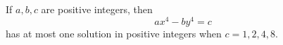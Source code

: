 \begin{proposition}
    If $a,b,c$ are positive integers, then
\[
    ax^4-by^4=c
\]
    has at most one solution in positive integers when $c=1,2,4,8$.
\end{proposition}
